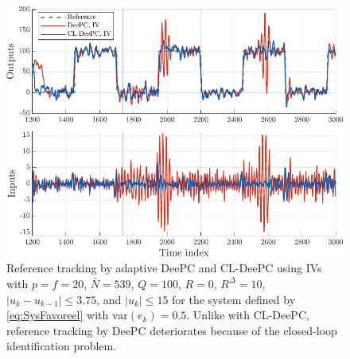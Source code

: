 \begin{figure}
\begin{center}
\includegraphics[width=\columnwidth]{results/figures/fig_prob_sol.pdf}    %
\caption{Reference tracking by adaptive \ac{DeePC} and \ac{CL-DeePC} using \ac{IVs} with $p=f=20$, $\bar{N}=539$, $Q=100$, $R=0$, $R^\Delta=10$, $|u_k-u_{k-1}|\leq3.75$, and $|u_k|\leq15$ for the system defined by \eqref{eq:SysFavoreel} with $\text{var}(e_k)=0.5$. %
Unlike with \ac{CL-DeePC}, reference tracking by \ac{DeePC} deteriorates because of the closed-loop identification problem.}  %
\label{fig:CL_Problem_Solution}                                 %
\end{center}                                 %
\end{figure}
